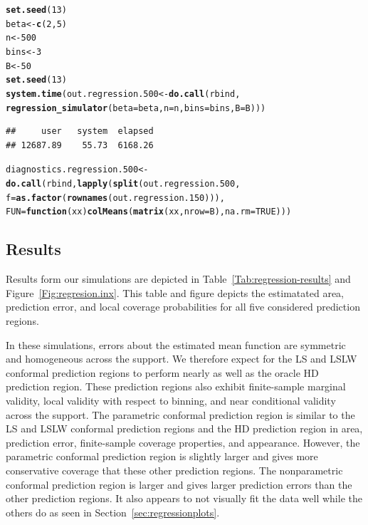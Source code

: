 \documentclass[11pt]{article}\usepackage[]{graphicx}\usepackage[]{color}
\makeatletter
\newcommand{\hlnum}[1]{\textcolor[rgb]{0.686,0.059,0.569}{#1}}%
\newcommand{\hlstd}[1]{\textcolor[rgb]{0.345,0.345,0.345}{#1}}%
\newcommand{\hlkwa}[1]{\textcolor[rgb]{0.161,0.373,0.58}{\textbf{#1}}}%
\newcommand{\hlkwb}[1]{\textcolor[rgb]{0.69,0.353,0.396}{#1}}%
\newcommand{\hlkwc}[1]{\textcolor[rgb]{0.333,0.667,0.333}{#1}}%
\newcommand{\hlkwd}[1]{\textcolor[rgb]{0.737,0.353,0.396}{\textbf{#1}}}%
\newenvironment{kframe}{%
 \def\at@end@of@kframe{}%
 \ifinner\ifhmode%
  \def\at@end@of@kframe{\end{minipage}}%
  \begin{minipage}{\columnwidth}%
 \fi\fi%
 \def\FrameCommand##1{\hskip\@totalleftmargin \hskip-\fboxsep
 \colorbox{shadecolor}{##1}\hskip-\fboxsep
     \hskip-\linewidth \hskip-\@totalleftmargin \hskip\columnwidth}%
 \MakeFramed {\advance\hsize-\width
   \@totalleftmargin\z@ \linewidth\hsize
   \@setminipage}}%
 {\par\unskip\endMakeFramed%
 \at@end@of@kframe}
\newenvironment{knitrout}{}{} %
\makeatother
\begin{document}
\begin{knitrout}
\color{fgcolor}\begin{kframe}
\begin{alltt}
\hlkwd{set.seed}\hlstd{(}\hlnum{13}\hlstd{)}
\hlstd{beta} \hlkwb{<-} \hlkwd{c}\hlstd{(}\hlnum{2}\hlstd{,} \hlnum{5}\hlstd{)}
\hlstd{n} \hlkwb{<-} \hlnum{500}
\hlstd{bins} \hlkwb{<-} \hlnum{3}
\hlstd{B} \hlkwb{<-} \hlnum{50}
\hlkwd{set.seed}\hlstd{(}\hlnum{13}\hlstd{)}
\hlkwd{system.time}\hlstd{(out.regression.500} \hlkwb{<-} \hlkwd{do.call}\hlstd{(rbind,}
  \hlkwd{regression_simulator}\hlstd{(}\hlkwc{beta} \hlstd{= beta,} \hlkwc{n} \hlstd{= n,} \hlkwc{bins} \hlstd{= bins,} \hlkwc{B} \hlstd{= B)))}
\end{alltt}
\begin{verbatim}
##     user   system  elapsed 
## 12687.89    55.73  6168.26
\end{verbatim}
\begin{alltt}
\hlstd{diagnostics.regression.500} \hlkwb{<-} \hlkwd{do.call}\hlstd{(rbind,} \hlkwd{lapply}\hlstd{(}\hlkwd{split}\hlstd{(out.regression.500,}
  \hlkwc{f} \hlstd{=} \hlkwd{as.factor}\hlstd{(}\hlkwd{rownames}\hlstd{(out.regression.150))),}
  \hlkwc{FUN} \hlstd{=} \hlkwa{function}\hlstd{(}\hlkwc{xx}\hlstd{)} \hlkwd{colMeans}\hlstd{(}\hlkwd{matrix}\hlstd{(xx,} \hlkwc{nrow} \hlstd{= B),} \hlkwc{na.rm} \hlstd{=} \hlnum{TRUE}\hlstd{)))}
\end{alltt}
\end{kframe}
\end{knitrout}


\subsection{Results}

Results form our simulations are depicted in 
Table~\ref{Tab:regression-results} and Figure~\ref{Fig:regresion.inx}.  
This table and figure depicts the estimatated area, prediction 
error, and local coverage probabilities for all five considered prediction 
regions. 

In these simulations, errors about the estimated mean function are symmetric 
and homogeneous across the support.  We therefore expect for the LS and LSLW 
conformal prediction regions to perform nearly as well as the oracle HD 
prediction region.  These prediction regions also exhibit finite-sample 
marginal validity, local validity with respect to binning, and near 
conditional validity across the support.  The parametric conformal prediction 
region is similar to the LS and LSLW conformal prediction regions and the HD 
prediction region in area, prediction error, finite-sample coverage 
properties, and appearance.  However, the parametric conformal prediction 
region is slightly larger and gives more conservative coverage that these 
other prediction regions.  The nonparametric conformal prediction region 
is larger and gives larger prediction errors than the other prediction 
regions.  It also appears to not visually fit the data well while the others 
do as seen in Section~\ref{sec:regressionplots}.
\end{document}
